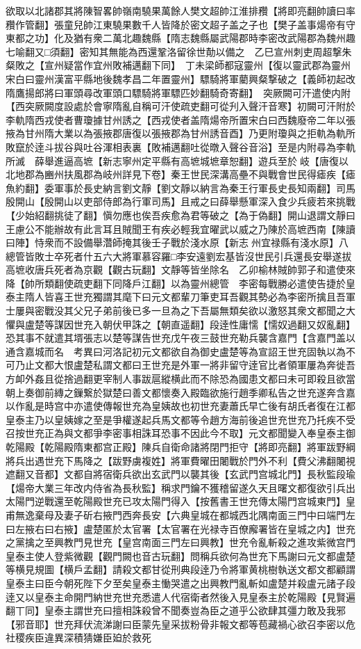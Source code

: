欲取以北諸郡其將陳智畧帥嶺南驍果萬餘人樊文超帥江淮排䂎【將即亮翻帥讀曰率䂎作管翻】張童兒帥江東驍果數千人皆降於密文超子盖之子也【樊子盖事煬帝有守東都之功】化及猶有衆二萬北趣魏縣【隋志魏縣屬武陽郡時李密改武陽郡為魏州趣七喻翻又□須翻】密知其無能為西還鞏洛留徐世勣以備之　乙巳宣州刺吏周超撃朱粲敗之【宣州疑當作宜州敗補邁翻下同】　丁未梁師都寇靈州【復以靈武郡為靈州宋白曰靈州漢富平縣地後魏孝昌二年置靈州】驃騎將軍藺興粲撃破之【義師初起改隋鷹揚郎將曰軍頭尋改軍頭口驃騎將軍驃匹妙翻騎奇寄翻】　突厥闕可汗遣使内附【西突厥闕度設處於會寧隋亂自稱可汗使疏吏翻可從刋入聲汗音寒】初闕可汗附於李軌隋西戎使者曹瓊據甘州誘之【西戎使者盖隋煬帝所置宋白曰西魏廢帝二年以張掖為甘州隋大業以為張掖郡唐復以張掖郡為甘州誘音酉】乃更附瓊與之拒軌為軌所敗竄於逹斗拔谷與吐谷渾相表裏【敗補邁翻吐從暾入聲谷音浴】至是内附尋為李軌所滅　薛舉進逼高墌【新志寧州定平縣有高墌城墌章恕翻】遊兵至於岐【唐復以北地郡為豳州扶風郡為岐州詳見下卷】秦王世民深溝高壘不與戰會世民得瘧疾【瘧魚約翻】委軍事於長史納言劉文靜【劉文靜以納言為秦王行軍長史長知兩翻】司馬殷開山【殷開山以吏部侍郎為行軍司馬】且戒之曰薛舉懸軍深入食少兵疲若來挑戰【少始紹翻挑徒了翻】愼勿應也俟吾疾愈為君等破之【為于偽翻】開山退謂文靜曰王慮公不能辦故有此言耳且賊聞王有疾必輕我宜曜武以威之乃陳於高墌西南【陳讀曰陣】恃衆而不設備舉濳師掩其後壬子戰於淺水原【新志州宜禄縣有淺水原】八總管皆敗士卒死者什五六大將軍慕容羅□李安遠劉宏基皆沒世民引兵還長安舉遂拔高墌收唐兵死者為京觀【觀古玩翻】文靜等皆坐除名　乙卯榆林賊帥郭子和遣使來降【帥所類翻使疏吏翻下同降戶江翻】以為靈州總管　李密每戰勝必遣使告捷於皇泰主隋人皆喜王世充獨謂其麾下曰元文都輩刀筆吏耳吾觀其勢必為李密所擒且吾軍士屢與密戰没其父兄子弟前後已多一旦為之下吾屬無類矣欲以激怒其衆文都聞之大懼與盧楚等謀因世充入朝伏甲誅之【朝直遥翻】段逹性庸懦【懦奴過翻又奴亂翻】恐其事不就遣其壻張志以楚等謀告世充戊午夜三鼓世充勒兵襲含嘉門【含嘉門盖以通含嘉城而名　考異曰河洛記初元文都欲自為御史盧楚等為宣詔王世充固執以為不可乃止文都大恨盧楚私謂文都曰王世充是外軍一將非留守逹官比者領軍屢為奔徙吾方卹外姦且從捨過翻更宰制人事跋扈縱横此而不除恐為國患文都曰未可即殺且欲當朝上奏御前縳之鏁繋於獄楚曰善文都懷奏入殿臨欲施行趙季卿私告之世充遂奔含嘉以作亂是時宫中亦遣使傳報世充為皇姨故也初世充妻蕭氏早亡後有胡氏者復在江都皇泰主乃以皇姨嫁之至是爭權遂起兵馬文都等令趙方海前後追世充世充乃托疾不受召按世充正為與文都爭李密事相誅耳恐事不因此今不取】元文都聞變入奉皇泰主御乾陽殿【乾陽殿隋東都宫正殿】陳兵自衛命諸將閉門拒守【將即亮翻】將軍跋野綱將兵出遇世充下馬降之【跋野虜複姓】將軍費曜田闍戰於門外不利【費父沸翻闍視遮翻又音都】文都自將宿衛兵欲出玄武門以襲其後【玄武門宫城北門】長秋監段瑜【煬帝大業三年改内侍省為長秋監】稱求門鑰不獲稽留遂久天且曙文都復欲引兵出太陽門逆戰還至乾陽殿世充已攻太陽門得入【按舊書王世充傳太陽門宫城東門】皇甫無逸棄母及妻子斫右掖門西奔長安【六典皇城在都城西北隅南面三門中曰端門左曰左掖右曰右掖】盧楚匿於太官署【太官署在光禄寺百僚廨署皆在皇城之内】世充之黨擒之至興教門見世充【皇宫南面三門左曰興教】世充令亂斬殺之進攻紫微宫門皇泰主使人登紫微觀【觀門闕也音古玩翻】問稱兵欲何為世充下馬謝曰元文都盧楚等横見規圖【横戶孟翻】請殺文都甘從刑典段逹乃令將軍黄桃樹執送文都文都顧謂皇泰主曰臣今朝死陛下夕至矣皇泰主慟哭遣之出興教門亂斬如盧楚并殺盧元諸子段逹又以皇泰主命開門納世充世充悉遣人代宿衛者然後入見皇泰主於乾陽殿【見賢遍翻丅同】皇泰主謂世充曰擅相誅殺曾不聞奏豈為臣之道乎公欲肆其彊力敢及我邪【邪音耶】世充拜伏流涕謝曰臣蒙先皇采拔粉骨非報文都等苞藏禍心欲召李密以危社稷疾臣違異深積猜嫌臣廹於救死